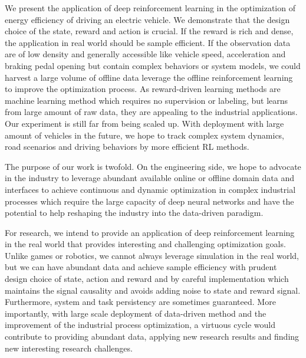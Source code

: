 \documentclass{article}
\begin{document}
We present the application of deep reinforcement learning in the optimization of energy efficiency of driving an electric vehicle. We demonstrate that the design choice of the state, reward and action is crucial. If the reward is rich and dense, the application in real world should be sample efficient. If the observation data are of low density and generally accessible like vehicle speed, acceleration and braking pedal opening but contain complex behaviors or system models, we could harvest a large volume of offline data leverage the offline reinforcement learning to improve the optimization process. As reward-driven learning methods are machine learning method which requires no supervision or labeling, but learns from large amount of raw data, they are appealing to the industrial applications. Our experiment is still far from being scaled up. With deployment with large amount of vehicles in the future, we hope to track complex system dynamics, road scenarios and driving behaviors by more efficient RL methods.

The purpose of our work is twofold. On the engineering side, we hope to advocate in the industry to leverage abundant available online or offline domain data and interfaces to achieve continuous and dynamic optimization in complex industrial processes which require the large capacity of deep neural networks and have the potential to help reshaping the industry into the data-driven paradigm.

For research, we intend to provide an application of deep reinforcement learning in the real world that provides interesting and challenging optimization goals. Unlike games or robotics, we cannot always leverage simulation in the real world, but we can have abundant data and achieve sample efficiency with prudent design choice of state, action and reward and by careful implementation which maintains the signal causality and avoids adding noise to state and reward signal. Furthermore, system and task persistency are sometimes guaranteed. More importantly, with large scale deployment of data-driven method and the improvement of the industrial process optimization, a virtuous cycle would contribute to providing abundant data, applying new research results and finding new interesting research challenges.
\end{document}

